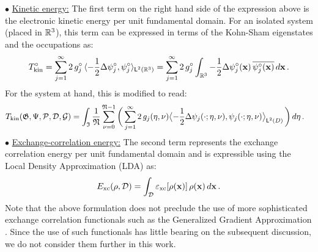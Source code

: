 \documentclass[preprint,12pt, 3p, sort&compress]{elsarticle}
\begin{document}
$\bullet$ \underline{Kinetic energy:} The first term on the right hand side of the expression above is the electronic kinetic energy per unit fundamental domain. For an isolated system (placed in $\mathbb{R}^3$), this term can be expressed \citep{ghosh2017sparc_1, ghosh2019symmetry} in terms of the Kohn-Sham eigenstates and the occupations as:
\begin{align}
T_{\text{kin}}^{\circ} = \sum_{j=1}^{\infty} {2}\,g_j^{\circ}\,\langle{-\frac{1}{2}}\Delta \psi_j^{\circ},\psi_j^{\circ}\rangle_{\textsf{L}^{2}_{}({\mathbb{R}^3})} = \sum_{j=1}^{\infty} {2}\,g_j^{\circ} \int_{\mathbb{R}^3}{-\frac{1}{2}}\Delta\psi_j^{\circ}({\bf x})\,\overline{\psi_j^{\circ}({\bf x})}\,d{\bf x}\,.
\end{align}
For the system at hand, this is modified to read:
\begin{align}
T_{\text{kin}}&(\mathfrak{G}, \Psi, {\cal P}, {\cal D}, {\cal G}) = \int_{\mathfrak{I}}\frac{1}{\mathfrak{N}}\sum_{\nu = 0}^{\mathfrak{N}-1}\bigg(\sum_{j=1}^{\infty}{2}\,g_j(\eta,\nu)\big\langle{{-\frac{1}{2}}\Delta \psi_j(\cdot; \eta,\nu)},{\psi_j(\cdot; \eta,\nu)}\big\rangle_{\textsf{L}^{2}_{}({D})}\,\bigg)\,d\eta\,.
\end{align}
$\bullet$ \underline{Exchange-correlation energy:} The second term represents the exchange correlation energy per unit fundamental domain and is expressible using the Local Density Approximation (LDA) \citep{KohnSham_DFT} as:
\begin{align}
E_{\text{xc}}(\rho, {{\cal D}}) = \int_{{{\cal D}}}\varepsilon_{\text{xc}}[\rho({\bf x})]\,\rho({\bf x})\,d{\bf x}\,.
\end{align}
Note that the above formulation does not preclude the use of more sophisticated exchange correlation functionals such as the Generalized Gradient Approximation \citep{GGA_made_simple_Perdew}. Since the use of such functionals has little bearing on the subsequent discussion, we do not consider them further in this work.
\end{document}
